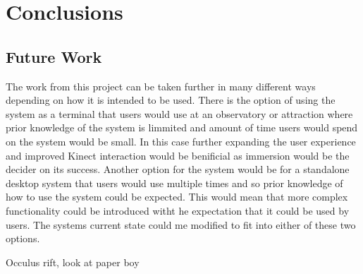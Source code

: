 \chapter{Conclusions}\label{C:con}
\section{Future Work}
The work from this project can be taken further in many different ways depending on how it is intended to be used. There is the option of using the system as a terminal that users would use at an observatory or attraction where prior knowledge of the system is limmited and amount of time users would spend on the system would be small. In this case further expanding the user experience and improved Kinect interaction would be benificial as immersion would be the decider on its success. Another option for the system would be for a standalone desktop system that users would use multiple times and so prior knowledge of how to use the system could be expected. This would mean that more complex functionality could be introduced witht he expectation that it could be used by users. The systems current state could me modified to fit into either of these two options.

Occulus rift, look at paper boy
